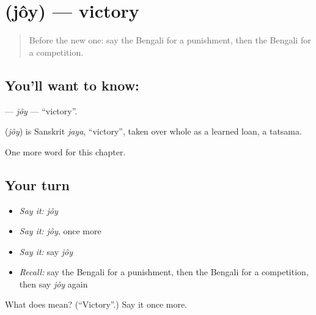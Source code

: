 \section[\texorpdfstring{\bn{জয়} (jôy)}{জয় (jôy)}]{ (jôy) — victory}

\label{lesson:BN-C260-joy}



\begin{quote}
Before the new one: say the Bengali for a punishment, then the Bengali for a competition.
\end{quote}

\subsection*{You'll want to know: }
\textbf{} — \emph{jôy} — \textquotedblleft{}victory\textquotedblright{}.

\begin{cousinweb}
\textbf{} (\emph{jôy}) is Sanskrit \emph{jaya}, \textquotedblleft{}victory\textquotedblright{}, taken over whole as a learned loan, a tatsama.
\end{cousinweb}

\begin{grammarlens}[title={What you've built}]
One more word for this chapter.
\end{grammarlens}

\subsection*{Your turn}
\begin{itemize}
\raggedright
  \item \emph{Say it:} \emph{jôy}
  \item \emph{Say it:} \emph{jôy}, once more
  \item \emph{Say it:} say \emph{jôy}
  \item \emph{Recall:} say the Bengali for a punishment, then the Bengali for a competition, then say \emph{jôy} again
\end{itemize}

\begin{tcolorbox}[breakable,colback=teal!4,colframe=teal!35!black,title={Before you move on}]
What does  mean? (\textquotedblleft{}Victory\textquotedblright{}.) Say it once more.
\end{tcolorbox}
